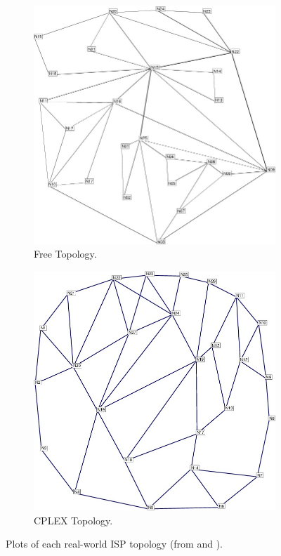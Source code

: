 \begin{figure}
    \begin{subfigure}{0.475\textwidth}
        \includegraphics[width=\textwidth]{figs/methodology/france.jpg}
        \caption{Free Topology.}
    \end{subfigure}
    \begin{subfigure}{0.475\textwidth}
        \includegraphics[width=\textwidth]{figs/methodology/norway.jpg}
        \caption{CPLEX Topology.}
    \end{subfigure}
    \caption[Plots of each real-world ISP topology.]{Plots of each real-world ISP topology (from \cite{knight_internet_2011} and \cite{orlowski_sndlib_2007}).}
    \label{fig:MISPplots}
\end{figure}

